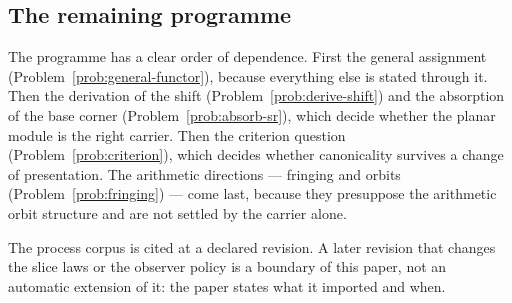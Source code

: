 \subsection{The remaining programme}

The programme has a clear order of dependence.  First the general assignment
(Problem~\ref{prob:general-functor}), because everything else is stated through it.
Then the derivation of the shift (Problem~\ref{prob:derive-shift}) and the absorption
of the base corner (Problem~\ref{prob:absorb-sr}), which decide whether the planar
module is the right carrier.  Then the criterion question
(Problem~\ref{prob:criterion}), which decides whether canonicality survives a change
of presentation.  The arithmetic directions --- fringing and orbits
(Problem~\ref{prob:fringing}) --- come last, because they presuppose the arithmetic
orbit structure and are not settled by the carrier alone.

The process corpus is cited at a declared revision.  A later revision that changes the
slice laws or the observer policy is a boundary of this paper, not an automatic
extension of it: the paper states what it imported and when.
